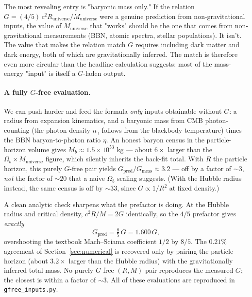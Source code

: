 \documentclass[11pt,letterpaper]{article}
\newcommand{\Runiv}{R_{\mathrm{universe}}}
\newcommand{\Muniv}{M_{\mathrm{universe}}}
\begin{document}
The most revealing entry is "baryonic mass only." If the relation
$G = (4/5)\, c^2\Runiv/\Muniv$ were a genuine prediction from
non-gravitational inputs, the value of $\Muniv$ that "works" should
be the one that comes from non-gravitational measurements (BBN,
atomic spectra, stellar populations). It isn't. The value that makes
the relation match $G$ requires including dark matter and dark
energy, both of which are gravitationally inferred. The match is
therefore even more circular than the headline calculation suggests:
most of the mass-energy "input" is itself a $G$-laden output.

\paragraph{A fully $G$-free evaluation.}
We can push harder and feed the formula \emph{only} inputs obtainable without
$G$: a radius from expansion kinematics, and a baryonic mass from CMB
photon-counting (the photon density $n_\gamma$ follows from the blackbody
temperature) times the BBN baryon-to-photon ratio $\eta$. An honest baryon
census in the particle-horizon volume gives $M_b \approx 1.5\times10^{53}$ kg ---
about $6\times$ larger than the $\Omega_b \times \Muniv$ figure, which silently
inherits the back-fit total. With $R$ the particle horizon, this purely $G$-free
pair yields $G_{\mathrm{pred}}/G_{\mathrm{meas}} \approx 3.2$ --- off by a factor
of $\sim 3$, \emph{not} the factor of $\sim 20$ that a naive $\Omega_b$ scaling
suggests. (With the Hubble radius instead, the same census is off by $\sim 33$,
since $G \propto 1/R^2$ at fixed density.)

A clean analytic check sharpens what the prefactor is doing. At the Hubble
radius and critical density, $c^2 R/M = 2G$ identically, so the $4/5$ prefactor
gives \emph{exactly}
\begin{equation}
  G_{\mathrm{pred}} = \tfrac{8}{5}\,G = 1.600\,G,
\end{equation}
overshooting the textbook Mach--Sciama coefficient $1/2$ by $8/5$. The
$0.21\%$ agreement of Section~\ref{sec:numerical} is recovered only by pairing
the particle horizon (about $3.2\times$ larger than the Hubble radius) with the
gravitationally inferred total mass. No purely $G$-free $(R, M)$ pair reproduces
the measured $G$; the closest is within a factor of $\sim 3$. All of these
evaluations are reproduced in \texttt{gfree\_inputs.py}.
\end{document}
